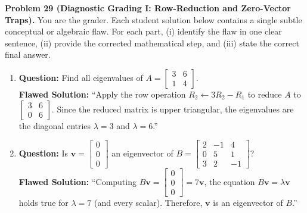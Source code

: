 \documentclass[11pt, letterpaper]{article}
\theoremstyle{definition}
\theoremstyle{remark}
\begin{document}
\textbf{Problem 29 (Diagnostic Grading I: Row-Reduction and Zero-Vector Traps).}
You are the grader. Each student solution below contains a single subtle conceptual or algebraic flaw. For each part, (i) identify the flaw in one clear sentence, (ii) provide the corrected mathematical step, and (iii) state the correct final answer.
\begin{enumerate}[label=(\alph*)]
    \item \textbf{Question:} Find all eigenvalues of $A = \begin{bmatrix} 3 & 6 \\ 1 & 4 \end{bmatrix}$.\\
    \textbf{Flawed Solution:} ``Apply the row operation $R_2 \leftarrow 3R_2 - R_1$ to reduce $A$ to $\begin{bmatrix} 3 & 6 \\ 0 & 6 \end{bmatrix}$. Since the reduced matrix is upper triangular, the eigenvalues are the diagonal entries $\lambda = 3$ and $\lambda = 6$.''
    \item \textbf{Question:} Is $\mathbf{v} = \begin{bmatrix} 0 \\ 0 \\ 0 \end{bmatrix}$ an eigenvector of $B = \begin{bmatrix} 2 & -1 & 4 \\ 0 & 5 & 1 \\ 3 & 2 & -1 \end{bmatrix}$?\\
    \textbf{Flawed Solution:} ``Computing $B\mathbf{v} = \begin{bmatrix} 0 \\ 0 \\ 0 \end{bmatrix} = 7\mathbf{v}$, the equation $B\mathbf{v} = \lambda\mathbf{v}$ holds true for $\lambda = 7$ (and every scalar). Therefore, $\mathbf{v}$ is an eigenvector of $B$.''
\end{enumerate}
\end{document}
